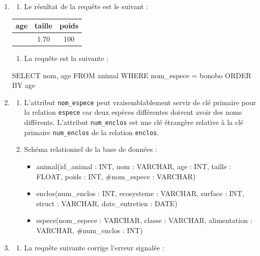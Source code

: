 \documentclass[
  letterpaper,
  DIV=11,
  numbers=noendperiod]{scrartcl}
\newenvironment{Shaded}{\begin{snugshade}}{\end{snugshade}}
\newcommand{\KeywordTok}[1]{\textcolor[rgb]{0.00,0.23,0.31}{#1}}
\newcommand{\NormalTok}[1]{\textcolor[rgb]{0.00,0.23,0.31}{#1}}
\newcommand{\OperatorTok}[1]{\textcolor[rgb]{0.37,0.37,0.37}{#1}}
\newcommand{\StringTok}[1]{\textcolor[rgb]{0.13,0.47,0.30}{#1}}
\providecommand{\tightlist}{%
  \setlength{\itemsep}{0pt}\setlength{\parskip}{0pt}}\usepackage{longtable,booktabs,array}
\begin{document}
\begin{enumerate}
\def\labelenumi{\arabic{enumi}.}
\item
  \begin{enumerate}
  \def\labelenumii{\alph{enumii}.}
  \tightlist
  \item
    Le résultat de la requête est le suivant :
  \end{enumerate}

  \begin{longtable}[]{@{}ccc@{}}
  \toprule\noalign{}
  age & taille & poids \\
  \midrule\noalign{}
  \endhead
  \bottomrule\noalign{}
  \endlastfoot
  6 & 1.70 & 100 \\
  \end{longtable}

  \begin{enumerate}
  \def\labelenumii{\alph{enumii}.}
  \setcounter{enumii}{1}
  \tightlist
  \item
    La requête est la suivante :
  \end{enumerate}

\begin{Shaded}
\begin{Highlighting}[]
\KeywordTok{SELECT}\NormalTok{ nom, age }
\KeywordTok{FROM}\NormalTok{ animal}
\KeywordTok{WHERE}\NormalTok{ nom\_espece }\OperatorTok{=} \StringTok{\textquotesingle{}bonobo\textquotesingle{}}
\KeywordTok{ORDER} \KeywordTok{BY}\NormalTok{ age}
\end{Highlighting}
\end{Shaded}
\item
  \begin{enumerate}
  \def\labelenumii{\alph{enumii}.}
  \item
    L'attribut \texttt{nom\_espece} peut vraisemblablement servir de clé
    primaire pour la relation \texttt{espece} car deux espèces
    différentes doivent avoir des noms différents. L'attribut
    \texttt{num\_enclos} est une clé étrangère relative à la clé
    primaire \texttt{num\_enclos} de la relation \texttt{enclos}.
  \item
    Schéma relationnel de la base de données :

    \begin{itemize}
    \tightlist
    \item
      animal({id\_animal} : INT, nom : VARCHAR, age : INT, taille :
      FLOAT, poids : INT, \#nom\_espece : VARCHAR)
    \item
      enclos({num\_enclos} : INT, ecosysteme : VARCHAR, surface : INT,
      struct : VARCHAR, date\_entretien : DATE)
    \item
      espece({nom\_espece} : VARCHAR, classe : VARCHAR, alimentation :
      VARCHAR, \#num\_enclos : INT)
    \end{itemize}
  \end{enumerate}
\item
  \begin{enumerate}
  \def\labelenumii{\alph{enumii}.}
  \tightlist
  \item
    La requête suivante corrige l'erreur signalée :
  \end{enumerate}


\end{enumerate}
\end{document}
